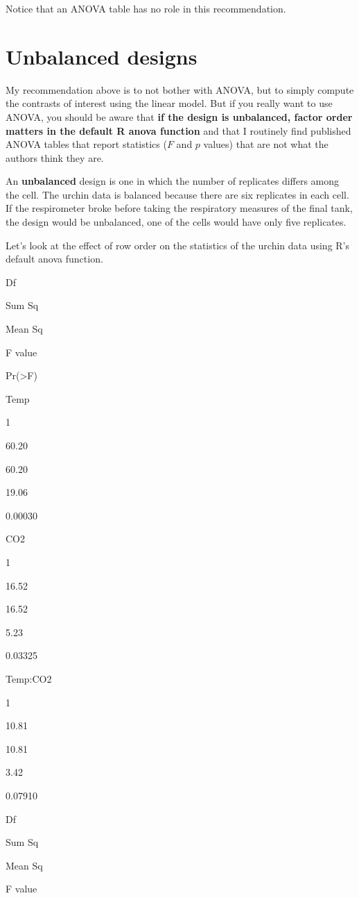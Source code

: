 \documentclass[]{book}
\begin{document}
Notice that an ANOVA table has no role in this recommendation.

\section{Unbalanced designs}\label{unbalanced-designs}

My recommendation above is to not bother with ANOVA, but to simply
compute the contrasts of interest using the linear model. But if you
really want to use ANOVA, you should be aware that \textbf{if the design
is unbalanced, factor order matters in the default R anova function} and
that I routinely find published ANOVA tables that report statistics
(\(F\) and \(p\) values) that are not what the authors think they are.

An \textbf{unbalanced} design is one in which the number of replicates
differs among the cell. The urchin data is balanced because there are
six replicates in each cell. If the respirometer broke before taking the
respiratory measures of the final tank, the design would be unbalanced,
one of the cells would have only five replicates.

Let's look at the effect of row order on the statistics of the urchin
data using R's default anova function.

Df

Sum Sq

Mean Sq

F value

Pr(\textgreater{}F)

Temp

1

60.20

60.20

19.06

0.00030

CO2

1

16.52

16.52

5.23

0.03325

Temp:CO2

1

10.81

10.81

3.42

0.07910

Df

Sum Sq

Mean Sq

F value
\end{document}
